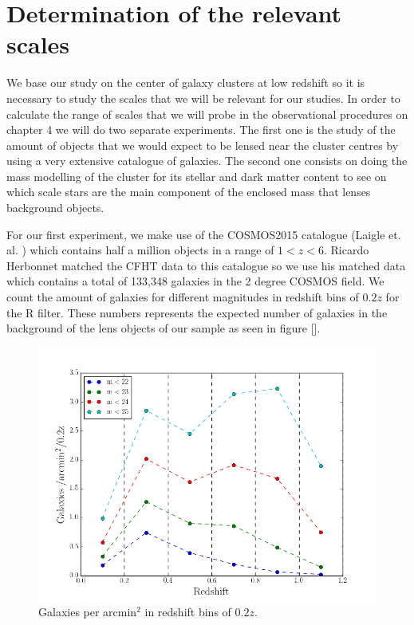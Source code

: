 \chapter{Determination of the relevant scales}

We base our study on the center of galaxy clusters at low redshift so it is necessary to study the scales that we will be relevant for our studies. In order to calculate the range of scales that we will probe in the observational procedures on chapter 4 we will do two separate experiments. The first one is the study of the amount of objects that we would expect to be lensed near the cluster centres by using a very extensive catalogue of galaxies. The second one consists on doing the mass modelling of the cluster for its stellar and dark matter content to see on which scale stars are the main component of the enclosed mass that lenses background objects.

For our first experiment, we make use of the COSMOS2015 catalogue (Laigle et. al. \citeyear{Reference21}) which contains half a million objects in a range of $1<z<6$. Ricardo Herbonnet matched the CFHT data to this catalogue so we use his matched data which contains a total of 133,348 galaxies in the 2 degree COSMOS field. We count the amount of galaxies for different magnitudes in redshift bins of $0.2z$ for the R filter. These numbers represents the expected number of galaxies in the background of the lens objects of our sample as seen in figure []. 

\begin{figure}[H]
\centering
\includegraphics[width=12cm]{images/galaxies_per_arcmin.png}
\caption[Galaxies per arcmin]{Galaxies per arcmin$^2$ in redshift bins of $0.2z$. }
\end{figure}

